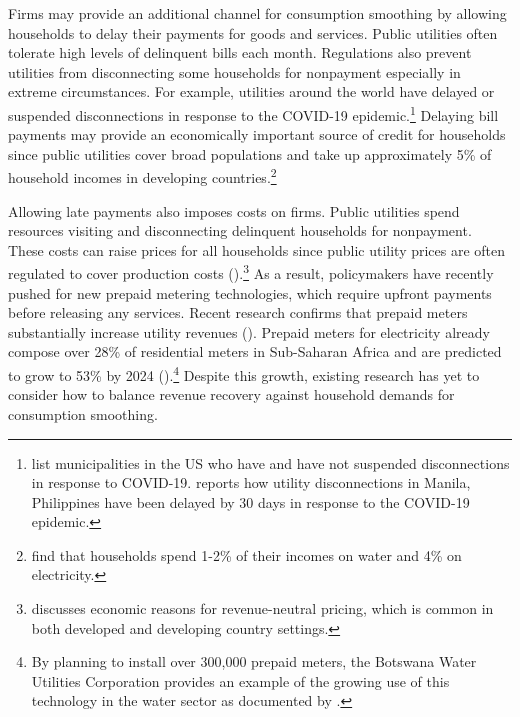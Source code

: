 \documentclass[12pt,table]{article}
\begin{document}
Firms may provide an additional channel for consumption smoothing by allowing households to delay their payments for goods and services.  Public utilities often tolerate high levels of delinquent bills each month.  Regulations also prevent utilities from disconnecting some households for nonpayment especially in extreme circumstances.  For example, utilities around the world have delayed or suspended disconnections in response to the COVID-19 epidemic.\footnote{\cite{bufordcampbell2020} list municipalities in the US who have and have not suspended disconnections in response to COVID-19.  \cite{domingo2020} reports how utility disconnections in Manila, Philippines have been delayed by 30 days in response to the COVID-19 epidemic.}   Delaying bill payments may provide an economically important source of credit for households since public utilities cover broad populations and take up approximately 5\% of household incomes in developing countries.\footnote{\cite{komives2006distributional} find that households spend 1-2\% of their incomes on water and 4\% on electricity.}

Allowing late payments also imposes costs on firms.  Public utilities spend resources visiting and disconnecting delinquent households for nonpayment.  These costs can raise prices for all households since public utility prices are often regulated to cover production costs (\cite{hoque2013state}).\footnote{\cite{laffont2005regulation} discusses economic reasons for revenue-neutral pricing, which is common in both developed and developing country settings.}  As a result, policymakers have recently pushed for new prepaid metering technologies, which require upfront payments before releasing any services.  Recent research confirms that prepaid meters substantially increase utility revenues (\cite{jack2016charging}).  Prepaid meters for electricity already compose over 28\% of residential meters in Sub-Saharan Africa and are predicted to grow to 53\% by 2024 (\cite{northeast2014}).\footnote{By planning to install over 300,000 prepaid meters, the Botswana Water Utilities Corporation provides an example of the growing use of this technology in the water sector as documented by \cite{heymans2014limits}.}  Despite this growth, existing research has yet to consider how to balance revenue recovery against household demands for consumption smoothing.

\end{document}
